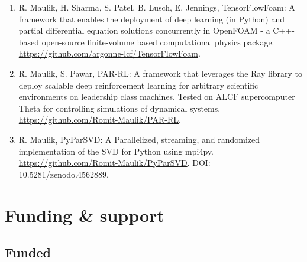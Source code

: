 \documentclass[letterpaper]{article}
\begin{document}
\begin{enumerate}

\item R. Maulik, H. Sharma, S. Patel, B. Lusch, E. Jennings, TensorFlowFoam: A framework that enables the deployment of deep learning (in Python) and partial differential equation solutions concurrently in OpenFOAM - a C++-based open-source finite-volume based computational physics package. \url{https://github.com/argonne-lcf/TensorFlowFoam}.

\item R. Maulik, S. Pawar, PAR-RL: A framework that leverages the Ray library to deploy scalable deep reinforcement learning for arbitrary scientific environments on leadership class machines. Tested on ALCF supercomputer Theta for controlling simulations of dynamical systems. \url{https://github.com/Romit-Maulik/PAR-RL}.

\item R. Maulik, PyParSVD: A Parallelized, streaming, and randomized implementation of the SVD for Python using mpi4py. \url{https://github.com/Romit-Maulik/PyParSVD}. DOI: 10.5281/zenodo.4562889.

\end{enumerate}

\section*{Funding \& support}

\subsection*{Funded}
\end{document}
